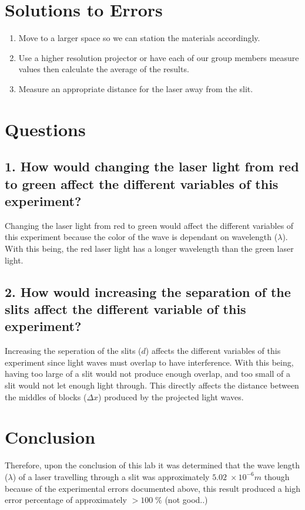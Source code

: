 \documentclass{article}
\begin{document}
\section*{Solutions to Errors} {
    \begin{enumerate}
        \item {Move to a larger space so we can station the materials accordingly.}
        \item {Use a higher resolution projector or have each of our group members measure values then calculate the average of the results.}
        \item {Measure an appropriate distance for the laser away from the slit.}
    \end{enumerate}\leavevmode
}
\section*{Questions} {
    \subsection*{\textbf{1.} How would changing the laser light from red to green affect the different variables of this experiment?} {
        Changing the laser light from red to green would affect the different variables of this experiment because the color of the wave is dependant on wavelength ($\lambda$). With this being, the red laser light has a longer wavelength  than the green laser light.
    }
    \subsection*{\textbf{2.} How would increasing the separation of the slits affect the different variable of this experiment?} {
        Increasing the seperation of the slits ($d$) affects the different variables of this experiment since light waves must overlap to have interference. With this being, having too large of a slit would not produce enough overlap, and too small of a slit would not let enough light through. This directly affects the distance between the middles of blocks ($\Delta x$) produced by the projected light waves.
    }
}
\section*{Conclusion} {
    Therefore, upon the conclusion of this lab it was determined that the wave length ($\lambda$) of a laser travelling through a slit was approximately $5.02\;\times 10^{-6}m$ though because of the experimental errors documented above, this result produced a high error percentage of approximately $>100\;\%$ (not good..)
}
\end{document}
